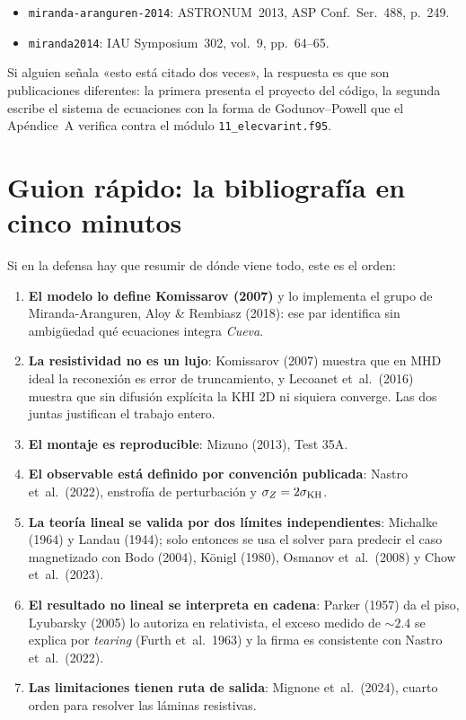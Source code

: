 \documentclass[11pt,openany]{report}
\newcommand{\clave}[1]{\texttt{\small #1}}
\begin{document}
\begin{itemize}
  \item \clave{miranda-aranguren-2014}: ASTRONUM~2013, ASP Conf.~Ser.~488, p.~249.
  \item \clave{miranda2014}: IAU Symposium~302, vol.~9, pp.~64--65.
\end{itemize}

Si alguien señala «esto está citado dos veces», la respuesta es que son
publicaciones diferentes: la primera presenta el proyecto del código, la
segunda escribe el sistema de ecuaciones con la forma de Godunov--Powell
que el Apéndice~A verifica contra el módulo \texttt{11\_elecvarint.f95}.

\chapter{Guion rápido: la bibliografía en cinco minutos}

Si en la defensa hay que resumir de dónde viene todo, este es el orden:

\begin{enumerate}\itemsep4pt
  \item \textbf{El modelo lo define Komissarov (2007)} y lo implementa el
        grupo de Miranda-Aranguren, Aloy \& Rembiasz (2018): ese par
        identifica sin ambigüedad qué ecuaciones integra \textit{Cueva}.
  \item \textbf{La resistividad no es un lujo}: Komissarov (2007) muestra que
        en MHD ideal la reconexión es error de truncamiento, y Lecoanet
        et~al.\ (2016) muestra que sin difusión explícita la KHI 2D ni
        siquiera converge. Las dos juntas justifican el trabajo entero.
  \item \textbf{El montaje es reproducible}: Mizuno (2013), Test 35A.
  \item \textbf{El observable está definido por convención publicada}:
        Nastro et~al.\ (2022), enstrofía de perturbación y $\sigma_Z=2\sigma_{\rm KH}$.
  \item \textbf{La teoría lineal se valida por dos límites independientes}:
        Michalke (1964) y Landau (1944); solo entonces se usa el solver
        para predecir el caso magnetizado con Bodo (2004), Königl (1980),
        Osmanov et~al.\ (2008) y Chow et~al.\ (2023).
  \item \textbf{El resultado no lineal se interpreta en cadena}: Parker
        (1957) da el piso, Lyubarsky (2005) lo autoriza en relativista,
        el exceso medido de $\sim2.4$ se explica por \textit{tearing}
        (Furth et~al.\ 1963) y la firma es consistente con Nastro et~al.\ (2022).
  \item \textbf{Las limitaciones tienen ruta de salida}: Mignone et~al.\ (2024),
        cuarto orden para resolver las láminas resistivas.
\end{enumerate}
\end{document}
